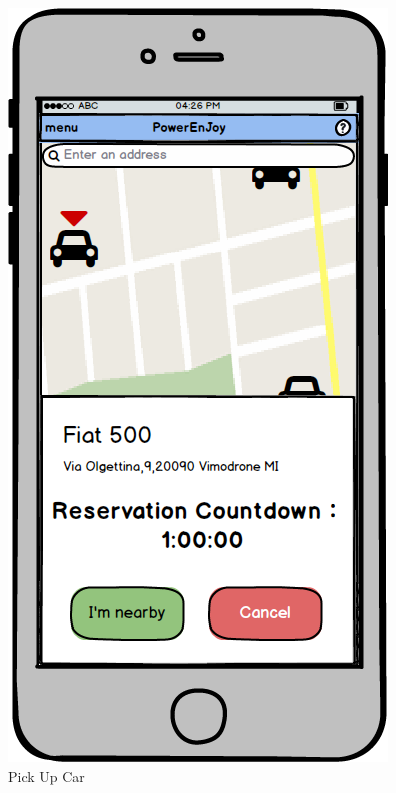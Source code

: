 \documentclass[a4paper,11pt]{article}
\begin{document}
\begin{itemize}
\begin{figure}[H]
\begin{minipage}[t]{.35\linewidth}
    \includegraphics[width=\textwidth]{images/pick}
  \caption{Pick Up Car}\label{fig-pick}
  \end{minipage}  
\end{figure}	
	\end{itemize}
\end{document}

